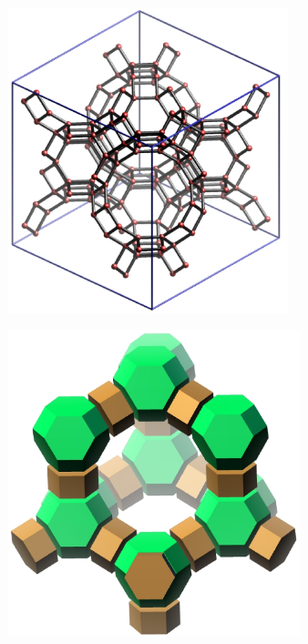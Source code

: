 \documentclass{beamer}
\begin{document}
\begin{frame}
  \begin{center}
    \includegraphics[height=3.5in]{fau-net.eps}
  \end{center}
\end{frame}

\begin{frame}
  \begin{center}
    \includegraphics[height=3.5in]{fau-cages.eps}
  \end{center}
\end{frame}
\end{document}
